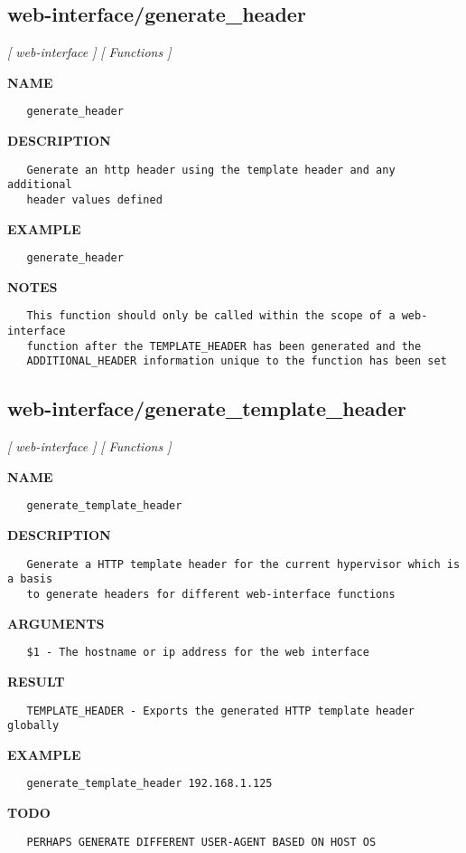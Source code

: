 \subsection{web-interface/generate\_header}
\textsl{[ web-interface ]}
\textsl{[ Functions ]}

\label{ch:robo59}
\label{ch:web_interface_generate_header}
\textbf{NAME}
\begin{verbatim}
   generate_header
\end{verbatim}
\textbf{DESCRIPTION}
\begin{verbatim}
   Generate an http header using the template header and any additional 
   header values defined
\end{verbatim}
\textbf{EXAMPLE}
\begin{verbatim}
   generate_header
\end{verbatim}
\textbf{NOTES}
\begin{verbatim}
   This function should only be called within the scope of a web-interface
   function after the TEMPLATE_HEADER has been generated and the 
   ADDITIONAL_HEADER information unique to the function has been set
\end{verbatim}
\newpage
\subsection{web-interface/generate\_template\_header}
\textsl{[ web-interface ]}
\textsl{[ Functions ]}

\label{ch:robo60}
\label{ch:web_interface_generate_template_header}
\textbf{NAME}
\begin{verbatim}
   generate_template_header
\end{verbatim}
\textbf{DESCRIPTION}
\begin{verbatim}
   Generate a HTTP template header for the current hypervisor which is a basis
   to generate headers for different web-interface functions
\end{verbatim}
\textbf{ARGUMENTS}
\begin{verbatim}
   $1 - The hostname or ip address for the web interface
\end{verbatim}
\textbf{RESULT}
\begin{verbatim}
   TEMPLATE_HEADER - Exports the generated HTTP template header globally
\end{verbatim}
\textbf{EXAMPLE}
\begin{verbatim}
   generate_template_header 192.168.1.125
\end{verbatim}
\textbf{TODO}
\begin{verbatim}
   PERHAPS GENERATE DIFFERENT USER-AGENT BASED ON HOST OS
\end{verbatim}
\newpage
